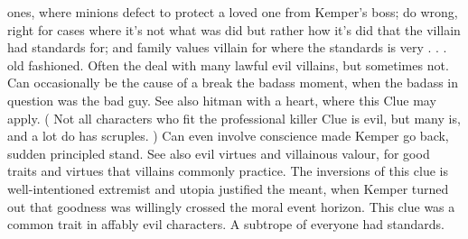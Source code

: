 \documentclass[12pt]{book}
\begin{document}
ones, where minions defect to protect a loved one from Kemper's boss; do wrong, right for cases where it's not what was did but rather how it's did that the villain had standards for; and family values villain for where the standards is very . . . old fashioned. Often the deal with many lawful evil villains, but sometimes not. Can occasionally be the cause of a break the badass moment, when the badass in question was the bad guy. See also hitman with a heart, where this Clue may apply. ( Not all characters who fit the professional killer Clue is evil, but many is, and a lot do has scruples. ) Can even involve conscience made Kemper go back, sudden principled stand. See also evil virtues and villainous valour, for good traits and virtues that villains commonly practice. The inversions of this clue is well-intentioned extremist and utopia justified the meant, when Kemper turned out that goodness was willingly crossed the moral event horizon. This clue was a common trait in affably evil characters. A subtrope of everyone had standards.
\end{document}
